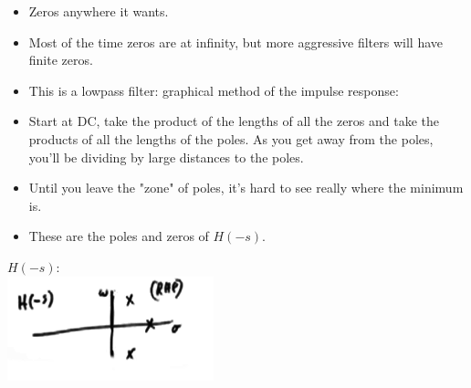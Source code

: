 \begin{itemize}
\item{Zeros anywhere it wants. }

\item{Most of the time zeros are at infinity, but more aggressive filters will have
    finite zeros.}

\item{This is a lowpass filter: graphical method of the impulse response:}

\item{Start at DC, take the product of the lengths of all the zeros and take the
products of all the lengths of the poles. As you get away from the poles,
you'll be dividing by large distances to the poles.}

\item{Until you leave the "zone" of poles, it's hard to see really where the minimum 
    is.} 

\item{These are the poles and zeros of $H(-s)$. }
\end{itemize}

$H(-s)$:
\\
\includegraphics[scale=0.5]{frames/14b}\\

